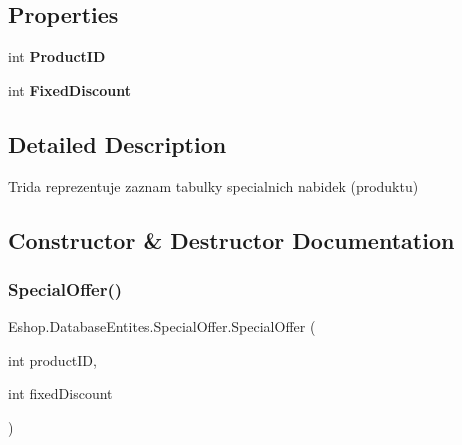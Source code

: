 \subsection*{Properties}
\begin{DoxyCompactItemize}
\item 
\mbox{\label{class_eshop_1_1_database_entites_1_1_special_offer_aebdd35349f6f56b6a510b15bae8b686a}} 
int {\bfseries Product\+ID}
\item 
\mbox{\label{class_eshop_1_1_database_entites_1_1_special_offer_a261b3372e611e44715ca0edf43a3313c}} 
int {\bfseries Fixed\+Discount}
\end{DoxyCompactItemize}


\subsection{Detailed Description}
Trida reprezentuje zaznam tabulky specialnich nabidek (produktu) 



\subsection{Constructor \& Destructor Documentation}
\mbox{\label{class_eshop_1_1_database_entites_1_1_special_offer_a4519a20bc462191dbc9a654ca7d14bd6}} 
\subsubsection{\texorpdfstring{SpecialOffer()}{SpecialOffer()}}
{\footnotesize\ttfamily Eshop.\+Database\+Entites.\+Special\+Offer.\+Special\+Offer (\begin{DoxyParamCaption}\item[{int}]{product\+ID,  }\item[{int}]{fixed\+Discount }\end{DoxyParamCaption})}




